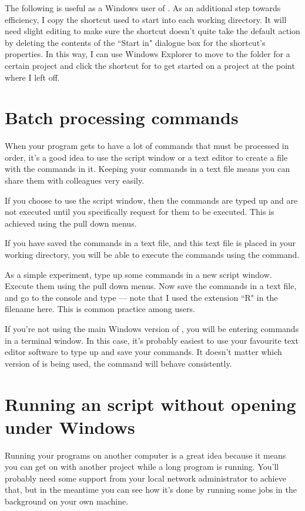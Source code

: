 The following is useful as a Windows user of \R{}. As an additional step towards efficiency, I copy the shortcut used to start \R{} into each working directory. It will need slight editing to make sure the shortcut doesn't quite take the default action by deleting the contents of the ``Start in" dialogue box for the shortcut's properties. In this way, I can use Windows Explorer to move to the folder for a certain project and click the shortcut for \R{} to get started on a project at the point where I left off. 
 
\section{Batch processing commands} 
 
When your \R{} program gets to have a lot of commands that must be processed in order, it's a good idea to use the \R{} script window or a text editor to create a file with the commands in it. Keeping your commands in a text file means you can share them with colleagues very easily. 
 
If you choose to use the \R{} script window, then the commands are typed up and are not executed until you specifically request for them to be executed. This is achieved using the pull down menus. 
 
If you have saved the commands in a text file, and this text file is placed in your working directory, you will be able to execute the commands using the  command. 
 
As a simple experiment, type up some commands in a new script window. Execute them using the pull down menus. Now save the commands in a text file, and go to the \R{} console and type  --- note that I used the extension ``R" in the filename here. This is common practice among \R{} users. 
 
If you're not using the main Windows version of \R{}, you will be entering commands in a terminal window. In this case, it's probably easiest to use your favourite text editor software to type up and save your \R{} commands. It doesn't matter which version of \R{} is being used, the  command will behave consistently. 
 
 
\section{Running an \R{} script without opening \R{} under Windows} 
 
Running your \R{} programs on another computer is a great idea because it means you can get on with another project while a long program is running. You'll probably need some support from your local network administrator to achieve that, but in the meantime you can see how it's done by running some jobs in the background on your own machine. 
 
